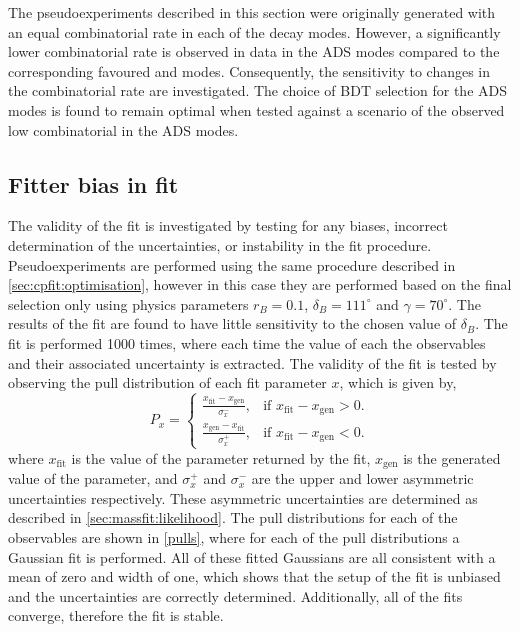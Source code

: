 The pseudoexperiments described in this section were originally generated with an equal combinatorial rate in each of the \Dz decay modes. However, a significantly lower combinatorial rate is observed in data in the ADS modes compared to the corresponding favoured \kpi and \kpipipi modes. Consequently, the sensitivity to changes in the combinatorial rate are investigated. The choice of BDT selection for the ADS modes is found to remain optimal when tested against a scenario of the observed low combinatorial in the ADS modes. 

\subsection{Fitter bias in \CP fit}
\label{sec:cpfit:fitterbias}

The validity of the \CP fit is investigated by testing for any biases, incorrect determination of the uncertainties, or instability in the \CP fit procedure. Pseudoexperiments are performed using the same procedure described in \sect\ref{sec:cpfit:optimisation}, however in this case they are performed based on the final selection only using physics parameters $r_B = 0.1$, $\delta_B = 111^{\circ}$ and $\gamma = 70^{\circ}$. The results of the fit are found to have little sensitivity to the chosen value of $\delta_B$. The \CP fit is performed 1000 times, where each time the value of each the \CP observables and their associated uncertainty is extracted. The validity of the fit is tested by observing the pull distribution of each fit parameter $x$, which is given by,
\begin{equation*}
P_x = \begin{cases}
	\frac{x_{\text{fit}} - x_{\text{gen}}}{\sigma_x^-}, & \text{if } x_{\text{fit}} - x_{\text{gen}} > 0. \\
	\frac{x_{\text{gen}} - x_{\text{fit}}}{\sigma_x^+}, & \text{if } x_{\text{fit}} - x_{\text{gen}} < 0.
	\end{cases}
\end{equation*}
where $x_{\text{fit}}$ is the value of the parameter returned by the fit, $x_{\text{gen}}$ is the generated value of the parameter, and $\sigma_x^+$ and $\sigma_x^-$ are the upper and lower asymmetric uncertainties respectively. These asymmetric uncertainties are determined as described in \sect\ref{sec:massfit:likelihood}. The pull distributions for each of the \CP observables are shown in \fig\ref{pulls}, where for each of the pull distributions a Gaussian fit is performed. All of these fitted Gaussians are all consistent with a mean of zero and width of one, which shows that the setup of the \CP fit is unbiased and the uncertainties are correctly determined. Additionally, all of the fits converge, therefore the fit is stable. 
 
